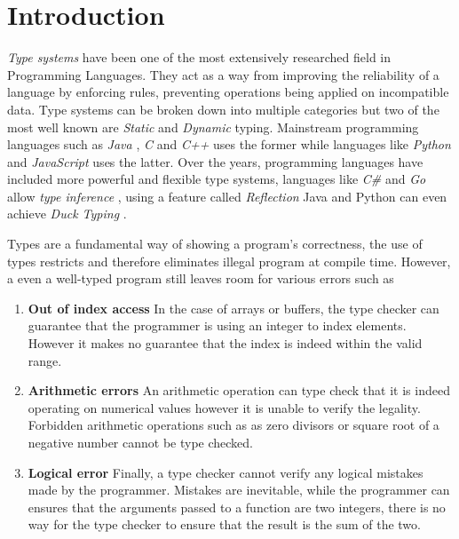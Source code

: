 \documentclass[a4paper,12pt]{report}
\begin{document}
\pagestyle{empty}
\singlespacing

\onehalfspacing

\singlespacing

\singlespacing


\setcounter{page}{0}
\pagestyle{plain}
\tableofcontents
\listoffigures
\listoftables

\onehalfspacing


\chapter{Introduction}
\setcounter{page}{1} 

\textit{Type systems} \cite{typesystem} have been one of the most extensively researched field in 
Programming Languages. They act as a way from improving the reliability of a 
language by enforcing rules, preventing operations being applied on 
incompatible data. Type systems can be broken down into multiple categories but 
two of the most well known are \textit{Static} \cite{staticTyping} and 
\textit{Dynamic} \cite{dynamicTyping} typing. Mainstream programming 
languages such as \textit{Java} \cite{java}, \textit{C} \cite{c} and \textit{C++} \cite{cpp} 
uses the former while languages like \textit{Python} \cite{python} and 
\textit{JavaScript} \cite{js} uses the latter. 
Over the years, programming languages have included more powerful and flexible 
type systems, languages like \textit{C\#} \cite{cSharp} and \textit{Go} \cite{goInferenceType} allow 
\textit{type inference} \cite{inferenceType}, using a feature called \textit{Reflection} 
Java and Python can even achieve \textit{Duck Typing} \cite{javaDuckType}.

\par
Types are a fundamental way of showing a program's correctness, the use of types 
restricts and therefore eliminates illegal program at compile time. However, a 
even a well-typed program still leaves room for various errors such as 
\begin{enumerate}
  \item {\textbf{Out of index access}} In the case of arrays or buffers, the type checker 
  can guarantee that the programmer is using an integer to index elements. 
  However it makes no guarantee that the index is indeed within the valid range. 
  \item {\textbf{Arithmetic errors}} An arithmetic operation can type check that it is 
  indeed operating on numerical values however it is unable to verify the 
  legality. Forbidden arithmetic operations such as as zero divisors or square 
  root of a negative number cannot be type checked. 
  \item {\textbf{Logical error}} Finally, a type checker cannot verify any logical 
  mistakes made by the programmer. Mistakes are inevitable, while the programmer 
  can ensures that the arguments passed to a function are two integers, there is 
  no way for the type checker to ensure that the result is the sum of the two. 
\end{enumerate}
\end{document}
